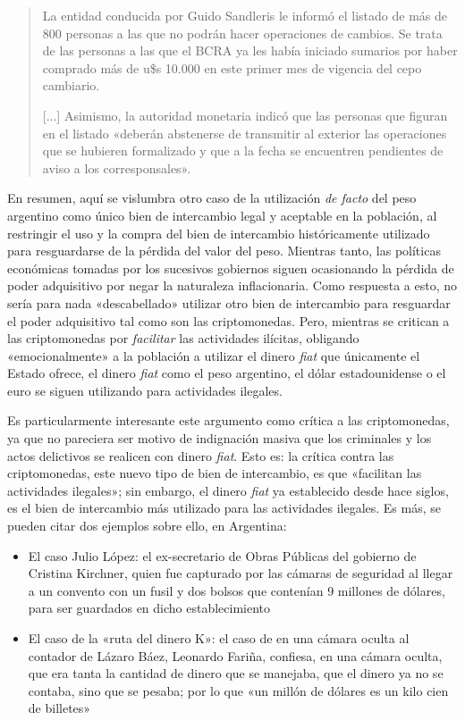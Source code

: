 \documentclass[12pt,a4paper,twoside]{book}
\begin{document}
\begin{quotation}
La entidad conducida por Guido Sandleris le informó el listado de más de 800 personas a las que no podrán hacer operaciones de cambios. Se trata de las personas a las que el BCRA ya les había iniciado sumarios por haber comprado más de u\$s 10.000 en este primer mes de vigencia del cepo cambiario.

[...] Asimismo, la autoridad monetaria indicó que las personas que figuran en el listado  «deberán abstenerse de transmitir al exterior las operaciones que se hubieren formalizado y que a la fecha se encuentren pendientes de aviso a los corresponsales». \cite{bcra:lista-negra}
\end{quotation}

En resumen, aquí se vislumbra otro caso de la utilización \textit{de facto} del peso argentino como único bien de intercambio legal y aceptable en la población, al restringir el uso y la compra del bien de intercambio históricamente utilizado para resguardarse de la pérdida del valor del peso. Mientras tanto, las políticas económicas tomadas por los sucesivos gobiernos siguen ocasionando la pérdida de poder adquisitivo por negar la naturaleza inflacionaria. Como respuesta a esto, no sería para nada «descabellado» utilizar otro bien de intercambio para resguardar el poder adquisitivo tal como son las criptomonedas. Pero, mientras se critican a las criptomonedas por \textit{facilitar} las actividades ilícitas, obligando «emocionalmente» a la población a utilizar el dinero \textit{fiat} que únicamente el Estado ofrece, el dinero \textit{fiat} como el peso argentino, el dólar estadounidense o el euro se siguen utilizando para actividades ilegales. 

Es particularmente interesante este argumento como crítica a las criptomonedas, ya que no pareciera ser motivo de indignación masiva que los criminales y los actos delictivos se realicen con dinero \textit{fiat}. Esto es: la crítica contra las criptomonedas, este nuevo tipo de bien de intercambio, es que «facilitan las actividades ilegales»; sin embargo, el dinero \textit{fiat} ya establecido desde hace siglos, es el bien de intercambio más utilizado para las actividades ilegales. Es más, se pueden citar dos ejemplos sobre ello, en Argentina:

\begin{itemize}
\item El caso Julio López: el ex-secretario de Obras Públicas del gobierno de Cristina Kirchner, quien fue capturado por las cámaras de seguridad al llegar a un convento con un fusil y dos bolsos que contenían 9 millones de dólares, para ser guardados en dicho establecimiento \cite{bolso-juliolopez1}
\item El caso de la «ruta del dinero K»: el caso de en una cámara oculta al contador de Lázaro Báez, Leonardo Fariña, confiesa, en una cámara oculta, que era tanta la cantidad de dinero que se manejaba, que el dinero ya no se contaba, sino que se pesaba; por lo que «un millón de dólares es un kilo cien de billetes» \cite{bolso-farina1}
\end{itemize}
\end{document}
